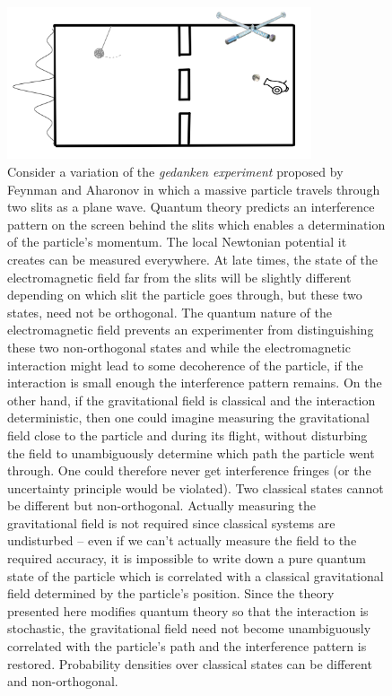 \documentclass[aps,pra,showpacs,citeautoscript,amsmath,amssymb,floatfix,superscriptaddress,bbm, verbatim,amsfonts,changes,10pt,nofootinbib,longbibliography]{revtex4-1}
\begin{document}
\begin{figure}[h]
\includegraphics[width=0.8\textwidth]{doubleslit.png}
\caption{Consider a variation of the {\it gedanken experiment} proposed by Feynman\cite{cecile2011role,Feynman:1996kb-note} and Aharonov\cite{AharonovParadoxes-note} in which a massive particle travels through two slits as a plane wave. Quantum theory predicts an interference pattern on the screen behind the slits which enables a determination of the particle's momentum. 
The local Newtonian potential it creates can be measured everywhere. %
	At late times, the state of the electromagnetic field far from the slits will be slightly different depending on which slit the particle goes through, but these two states, need not be orthogonal. The quantum nature of the electromagnetic field prevents an experimenter from distinguishing these two non-orthogonal states and while the electromagnetic interaction might lead to some decoherence of the particle, if the interaction is small enough the interference pattern remains. On the other hand, if the gravitational field is classical and the interaction deterministic, then one could imagine measuring the gravitational field close to the particle and during its flight, without disturbing the field to unambiguously determine which path the particle went through. One could therefore never get interference fringes (or the uncertainty principle would be violated). Two classical states cannot be different but non-orthogonal. Actually measuring the gravitational field is not required since classical systems are undisturbed -- even if we can't actually measure the field to the required accuracy\cite{mattingly2006eppley}, it is impossible to write down a pure quantum state of the particle which is correlated with a classical gravitational field determined by the particle's position. Since the theory presented here modifies quantum theory so that the interaction is stochastic, the gravitational field need not become unambiguously correlated with the particle's path and the interference pattern is restored. Probability densities over classical states can be different and non-orthogonal.}
\label{fig:doubleslit}
\end{figure}
\end{document}
